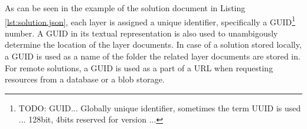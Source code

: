 As can be seen in the example of the solution document in Listing \ref{lst:solution.json}, each layer is assigned a unique identifier, specifically a GUID\footnote{TODO: GUID... Globally unique identifier, sometimes the term UUID is used ... 128bit, 4bits reserved for version ...} number. A GUID in its textual representation is also used to unambigously determine the location of the layer documents. In case of a solution stored locally, a GUID is used as a name of the folder the related layer documents are stored in. For remote solutions, a GUID is used as a part of a URL when requesting resources from a database or a blob storage.


